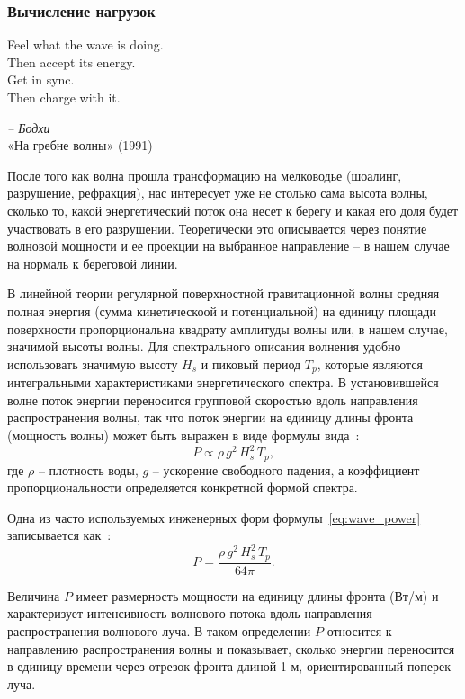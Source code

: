
\subsubsection{Вычисление нагрузок}

\epigraph{
    Feel what the wave is doing.\\
    Then accept its energy.\\
    Get in sync.\\
    Then charge with it.
}{\textit{-- Бодхи}\\«На гребне волны» (1991)}


После того как волна прошла трансформацию на мелководье (шоалинг, разрушение, рефракция), нас интересует уже не столько сама высота волны, сколько то, какой энергетический поток она несет к берегу и какая его доля будет участвовать в его разрушении. 
Теоретически это описывается через понятие волновой мощности и ее проекции на выбранное направление -- в нашем случае на нормаль к береговой линии.

В линейной теории регулярной поверхностной гравитационной волны средняя полная энергия (сумма кинетическоой и потенциальной) на единицу площади поверхности пропорциональна квадрату амплитуды волны или, в нашем случае, значимой высоты волны. 
Для спектрального описания волнения удобно использовать значимую высоту $H_s$ и пиковый период $T_p$, которые являются интегральными характеристиками энергетического спектра. 
В установившейся волне поток энергии переносится групповой скоростью вдоль направления распространения волны, так что поток энергии на единицу длины фронта (мощность волны) может быть выражен в виде формулы вида~\cite{Muraleedharan2023Spectral}:
\begin{equation}\label{eq:wave_power}
    P \propto \rho\,g^2\,H_s^2\,T_p,
\end{equation}
где $\rho$ -- плотность воды, $g$ -- ускорение свободного падения, а коэффициент пропорциональности определяется конкретной формой спектра.

Одна из часто используемых инженерных форм формулы~\eqref{eq:wave_power} записывается как~\cite{guillou2020estimating}:
\begin{equation}
    P = \frac{\rho\,g^2\,H_s^2\,T_p}{64\pi}.
\end{equation}

Величина $P$ имеет размерность мощности на единицу длины фронта (Вт/м) и характеризует интенсивность волнового потока вдоль направления распространения волнового луча.
В таком определении $P$ относится к направлению распространения волны и показывает, сколько энергии переносится в единицу времени через отрезок фронта длиной 1 м, ориентированный поперек луча. 

